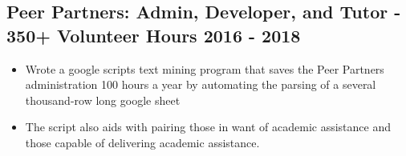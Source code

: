\documentclass{article}
\begin{document}
\subsection{Peer Partners: Admin, Developer, and Tutor - 350+ Volunteer Hours \hfill 2016 - 2018}
\begin{itemize}[leftmargin=0.5in]
  \setlength\itemsep{0.00em}
  \item Wrote a google scripts text mining program that saves the Peer Partners administration 100 hours a year by automating the parsing of a several thousand-row long google sheet
  \item The script also aids with pairing those in want of academic assistance and those capable of delivering academic assistance.
\end{itemize}


\end{document}
